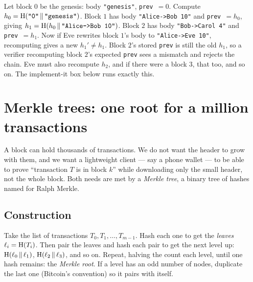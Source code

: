 \begin{example}
\label{ch36:ex-chain}
Let block $0$ be the genesis: body \texttt{"genesis"}, \texttt{prev}~$=0$. Compute $h_0=\operatorname{H}(\texttt{"0"}\,\|\,\texttt{"genesis"})$. Block $1$ has body \texttt{"Alice->Bob 10"} and \texttt{prev}~$=h_0$, giving $h_1=\operatorname{H}(h_0\,\|\,\texttt{"Alice->Bob 10"})$. Block $2$ has body \texttt{"Bob->Carol 4"} and \texttt{prev}~$=h_1$. Now if Eve rewrites block $1$'s body to \texttt{"Alice->Eve 10"}, recomputing gives a new $h_1'\ne h_1$. Block $2$'s stored \texttt{prev} is still the old $h_1$, so a verifier recomputing block $2$'s expected \texttt{prev} sees a mismatch and rejects the chain. Eve must also recompute $h_2$, and if there were a block $3$, that too, and so on. The implement-it box below runs exactly this.
\end{example}

\section{Merkle trees: one root for a million transactions}
\label{ch36:merkle}

A block can hold thousands of transactions. We do not want the header to grow with them, and we want a lightweight client --- say a phone wallet --- to be able to prove ``transaction $T$ is in block $k$'' while downloading only the small header, not the whole block. Both needs are met by a \emph{Merkle tree}, a binary tree of hashes named for Ralph Merkle.

\subsection{Construction}
\label{ch36:merkle-build}

Take the list of transactions $T_0,T_1,\dots,T_{m-1}$. Hash each one to get the \emph{leaves} $\ell_i = \operatorname{H}(T_i)$. Then pair the leaves and hash each pair to get the next level up: $\operatorname{H}(\ell_0\,\|\,\ell_1)$, $\operatorname{H}(\ell_2\,\|\,\ell_3)$, and so on. Repeat, halving the count each level, until one hash remains: the \emph{Merkle root}. If a level has an odd number of nodes, duplicate the last one (Bitcoin's convention) so it pairs with itself.

